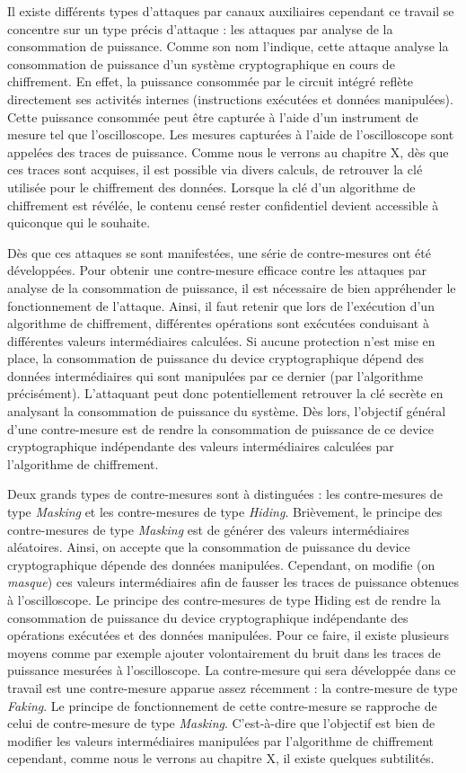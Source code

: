 \documentclass[oneside]{book}
\begin{document}
Il existe différents types d'attaques par canaux auxiliaires cependant ce travail se concentre sur un type précis d'attaque : les attaques par analyse de la consommation de puissance. Comme son nom l'indique, cette attaque analyse la consommation de puissance d'un système cryptographique en cours de chiffrement. En effet, la puissance consommée par le circuit intégré reflète directement ses activités internes (instructions exécutées et données manipulées). Cette puissance consommée peut être capturée à l'aide d'un instrument de mesure tel que l'oscilloscope. Les mesures capturées à l'aide de l'oscilloscope sont appelées des traces de puissance. Comme nous le verrons au chapitre X, dès que ces traces sont acquises, il est possible via divers calculs, de retrouver la clé utilisée pour le chiffrement des données. Lorsque la clé d'un algorithme de chiffrement est révélée, le contenu censé rester confidentiel devient accessible à quiconque qui le souhaite.

Dès que ces attaques se sont manifestées, une série de contre-mesures ont été développées. Pour obtenir une contre-mesure efficace contre les attaques par analyse de la consommation de puissance, il est nécessaire de bien appréhender le fonctionnement de l'attaque. Ainsi, il faut retenir que lors de l’exécution d’un algorithme de chiffrement, différentes opérations sont exécutées conduisant à différentes valeurs intermédiaires calculées. Si aucune protection n’est mise en place, la consommation de puissance du device cryptographique dépend des données intermédiaires qui sont manipulées par ce dernier (par l’algorithme précisément). L’attaquant peut donc potentiellement retrouver la clé secrète en analysant la consommation de puissance du système. Dès lors, l'objectif général d'une contre-mesure est de rendre la consommation de puissance de ce device cryptographique indépendante des valeurs intermédiaires calculées par l'algorithme de chiffrement. 

Deux grands types de contre-mesures sont à distinguées : les contre-mesures de type \textit{Masking} et les contre-mesures de type \textit{Hiding}. Brièvement, le principe des contre-mesures de type \textit{Masking} est de générer des valeurs intermédiaires aléatoires. Ainsi, on accepte que la consommation de puissance du device cryptographique dépende des données manipulées. Cependant, on modifie (on \textit{masque}) ces valeurs intermédiaires afin de fausser les traces de puissance obtenues à l’oscilloscope. Le principe des contre-mesures de type Hiding est de rendre la consommation de puissance du device cryptographique indépendante des opérations exécutées et des données manipulées. Pour ce faire, il existe plusieurs moyens comme par exemple ajouter volontairement du bruit dans les traces de puissance mesurées à l'oscilloscope. La contre-mesure qui sera développée dans ce travail est une contre-mesure apparue assez récemment : la contre-mesure de type \textit{Faking}. Le principe de fonctionnement de cette contre-mesure se rapproche de celui de contre-mesure de type \textit{Masking}. C'est-à-dire que l'objectif est bien de modifier les valeurs intermédiaires manipulées par l'algorithme de chiffrement cependant, comme nous le verrons au chapitre X, il existe quelques subtilités.
\end{document}
